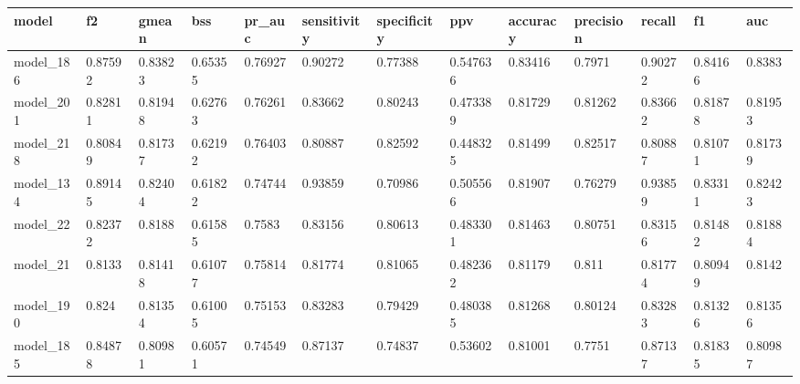 \begin{tabular}{|l|l|l|l|l|l|l|l|l|l|l|l|l|}
\hline
\textbf{model} & \textbf{f2} & \textbf{gmean} & \textbf{bss} & \textbf{pr\_auc} & \textbf{sensitivity} & \textbf{specificity} & \textbf{ppv} & \textbf{accuracy} & \textbf{precision} & \textbf{recall} & \textbf{f1} & \textbf{auc} \\ \hline
model\_186     & 0.87592     & 0.83823        & 0.65355      & 0.76927          & 0.90272              & 0.77388              & 0.547636     & 0.83416           & 0.7971             & 0.90272         & 0.84166     & 0.8383       \\ \hline
model\_201     & 0.82811     & 0.81948        & 0.62763      & 0.76261          & 0.83662              & 0.80243              & 0.473389     & 0.81729           & 0.81262            & 0.83662         & 0.81878     & 0.81953      \\ \hline
model\_218     & 0.80849     & 0.81737        & 0.62192      & 0.76403          & 0.80887              & 0.82592              & 0.448325     & 0.81499           & 0.82517            & 0.80887         & 0.81071     & 0.81739      \\ \hline
model\_134     & 0.89145     & 0.82404        & 0.61822      & 0.74744          & 0.93859              & 0.70986              & 0.505566     & 0.81907           & 0.76279            & 0.93859         & 0.83311     & 0.82423      \\ \hline
model\_22      & 0.82372     & 0.8188         & 0.61585      & 0.7583           & 0.83156              & 0.80613              & 0.483301     & 0.81463           & 0.80751            & 0.83156         & 0.81482     & 0.81884      \\ \hline
model\_21      & 0.8133      & 0.81418        & 0.61077      & 0.75814          & 0.81774              & 0.81065              & 0.482362     & 0.81179           & 0.811              & 0.81774         & 0.80949     & 0.8142       \\ \hline
model\_190     & 0.824       & 0.81354        & 0.61005      & 0.75153          & 0.83283              & 0.79429              & 0.480385     & 0.81268           & 0.80124            & 0.83283         & 0.81326     & 0.81356      \\ \hline
model\_185     & 0.84878     & 0.80981        & 0.60571      & 0.74549          & 0.87137              & 0.74837              & 0.53602      & 0.81001           & 0.7751             & 0.87137         & 0.81835     & 0.80987      \\ \hline

\end{tabular}
